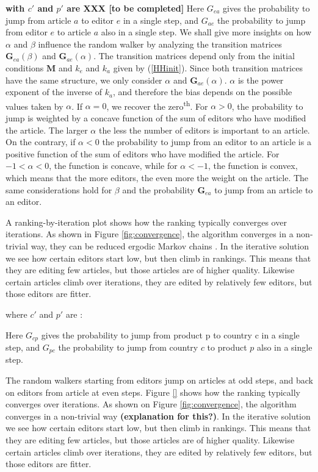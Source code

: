 {\bf with $c'$ and $p'$ are XXX [to be completed]} Here $G_{ea}$ gives the probability to jump from article $a$ to editor $e$ in a single step, and $G_{ae}$ the probability to jump from editor $e$ to article $a$ also in a single step. We shall give more insights on how $\alpha$ and $\beta$ influence the random walker by analyzing the transition matrices $\mathbf{G}_{ea}(\beta)$ and $\mathbf{G}_{ae}(\alpha)$. The transition matrices depend only from the initial conditions $\mathbf{M}$ and $k_e$ and $k_a$ given by (\ref{HHinit}). Since both transition matrices have the same structure, we only consider $\alpha$  and $\mathbf{G}_{ae}(\alpha)$. $\alpha$ is the power exponent of the inverse of $k_a$, and therefore the bias depends on the possible values taken by $\alpha$. If $\alpha = 0$, we recover the zero\textsuperscript{th}. For $\alpha > 0$, the probability to jump is weighted by a concave function of the sum of editors who have modified the article. The larger $\alpha$ the less the number of editors is important to an article. On the contrary, if $\alpha < 0$ the probability to jump from an editor to an article is a positive function of the sum of editors who have modified the article. For $-1 < \alpha < 0$, the function is concave, while for $\alpha < -1$, the function is convex, which means that the more editors, the even more the weight on the article. The same considerations hold for $\beta$ and the probability $\mathbf{G}_{ea}$ to jump from an article to an editor. 



A ranking-by-iteration plot shows how the ranking typically converges over iterations. As shown in Figure \ref{fig:convergence}, the algorithm converges in a non-trivial way, they can be reduced ergodic Markov chains \cite{Firm Grounds}. In the iterative solution we see how certain editors start low, but then climb in rankings. This means that they are editing few articles, but those articles are of higher quality. Likewise certain articles climb over iterations, they are edited by relatively few editors, but those editors are fitter.

where $c'$ and $p'$ are :

Here $G_{cp}$ gives the probability to jump from product p to country c
in a single step, and $G_{pc}$ the probability to jump from country $c$ to
product $p$ also in a single step.


The random walkers starting from editors jump on articles at odd steps, and back on editors from article at even steps. Figure \ref{} shows how the ranking typically converges over iterations. As shown on Figure \ref{fig:convergence}, the algorithm converges in a non-trivial way {\bf (explanation for this?)}. In the iterative solution we see how certain editors start low, but then climb in rankings. This means that they are editing few articles, but those articles are of higher quality. Likewise certain articles climb over iterations, they are edited by relatively few editors, but those editors are fitter.


